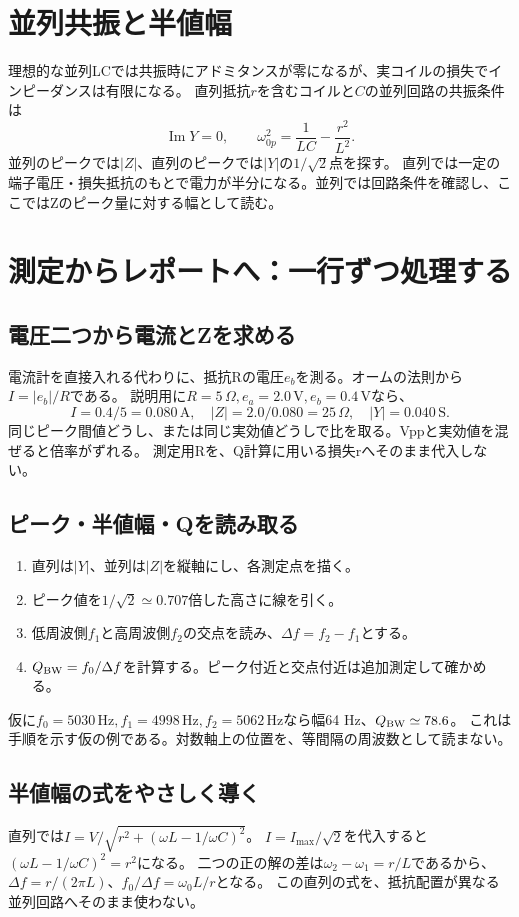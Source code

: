 \documentclass[lualatex,a4paper,10pt]{jlreq}
\begin{document}
\section{並列共振と半値幅}\label{sec:auto6}
理想的な並列LCでは共振時にアドミタンスが零になるが、実コイルの損失でインピーダンスは有限になる。
直列抵抗$r$を含むコイルと$C$の並列回路の共振条件は
\[
 \operatorname{Im}Y=0,\qquad \omega_{0p}^2=\frac1{LC}-\frac{r^2}{L^2}.
\]
並列のピークでは$|Z|$、直列のピークでは$|Y|$の$1/\sqrt2$点を探す。
直列では一定の端子電圧・損失抵抗のもとで電力が半分になる。並列では回路条件を確認し、ここではZのピーク量に対する幅として読む。
\section{測定からレポートへ：一行ずつ処理する}\label{sec:auto7}
\subsection{電圧二つから電流とZを求める}
電流計を直接入れる代わりに、抵抗Rの電圧$e_b$を測る。オームの法則から$I=|e_b|/R$である。
説明用に$R=5\,\Omega,e_a=2.0\,\mathrm{V},e_b=0.4\,\mathrm{V}$なら、
\[
 I=0.4/5=0.080\,\mathrm{A},\quad |Z|=2.0/0.080=25\,\Omega,\quad |Y|=0.040\,\mathrm{S}.
\]
同じピーク間値どうし、または同じ実効値どうしで比を取る。Vppと実効値を混ぜると倍率がずれる。
測定用Rを、Q計算に用いる損失rへそのまま代入しない。
\subsection{ピーク・半値幅・Qを読み取る}
\begin{enumerate}
\item 直列は$|Y|$、並列は$|Z|$を縦軸にし、各測定点を描く。
\item ピーク値を$1/\sqrt2\simeq0.707$倍した高さに線を引く。
\item 低周波側$f_1$と高周波側$f_2$の交点を読み、$\Delta f=f_2-f_1$とする。
\item $Q_{\rm BW}=f_0/\Delta f$を計算する。ピーク付近と交点付近は追加測定して確かめる。
\end{enumerate}
仮に$f_0=5030\,\mathrm{Hz},f_1=4998\,\mathrm{Hz},f_2=5062\,\mathrm{Hz}$なら幅64 Hz、$Q_{\rm BW}\simeq78.6$。
これは手順を示す仮の例である。対数軸上の位置を、等間隔の周波数として読まない。
\subsection{半値幅の式をやさしく導く}
直列では$I=V/\sqrt{r^2+(\omega L-1/\omega C)^2}$。
$I=I_{\max}/\sqrt2$を代入すると$(\omega L-1/\omega C)^2=r^2$になる。
二つの正の解の差は$\omega_2-\omega_1=r/L$であるから、
$\Delta f=r/(2\pi L)$、$f_0/\Delta f=\omega_0L/r$となる。
この直列の式を、抵抗配置が異なる並列回路へそのまま使わない。
\end{document}
